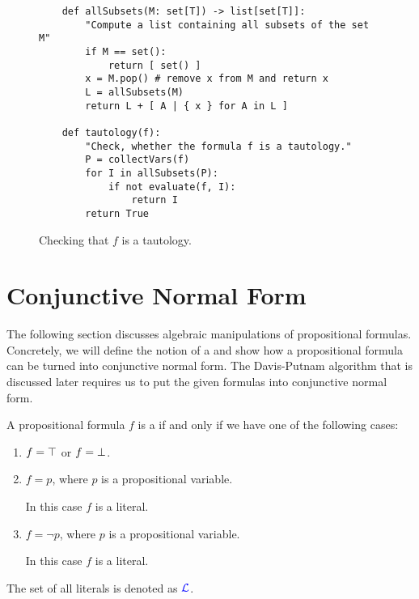 \begin{figure}[!ht]
  \centering
\begin{verbatim}
    def allSubsets(M: set[T]) -> list[set[T]]:
        "Compute a list containing all subsets of the set M"
        if M == set():
            return [ set() ]
        x = M.pop() # remove x from M and return x
        L = allSubsets(M)
        return L + [ A | { x } for A in L ]

    def tautology(f):
        "Check, whether the formula f is a tautology."
        P = collectVars(f)
        for I in allSubsets(P):
            if not evaluate(f, I):
                return I
        return True
\end{verbatim}
\vspace*{-0.3cm}
  \caption{Checking that $f$ is a tautology.}
  \label{fig:tautology.py}
\end{figure}



\section{Conjunctive Normal Form}
The following section discusses algebraic manipulations of propositional formulas.  Concretely, we will define
the notion of a  and show how a propositional formula can be turned into
conjunctive normal form.  The Davis-Putnam algorithm that is discussed later requires us to put the given
formulas into conjunctive normal form.

\begin{Definition}[Literal]
  A propositional formula $f$ is a  if and only if we have one of the following cases: 
  \begin{enumerate}
  \item $f = \top$ or $f = \bot$.
  \item $f = p$, where $p$ is a propositional variable.

        In this case $f$ is a  literal.
  \item $f = \neg p$, where $p$ is a propositional variable. 

        In this case $f$ is a  literal.
  \end{enumerate}
  The set of all literals is denoted as  ${\color{blue}\mathcal{L}}$.  \eox
\end{Definition}

